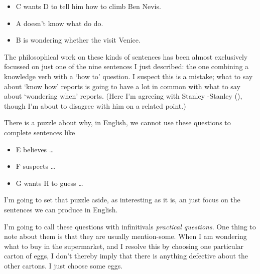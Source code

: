 \documentclass[
  10pt,
  letterpaper,
  twoside]{scrbook}
\providecommand{\tightlist}{%
  \setlength{\itemsep}{0pt}\setlength{\parskip}{0pt}}\usepackage{longtable,booktabs,array}
\begin{document}
\begin{itemize}
\tightlist
\item
  C wants D to tell him how to climb Ben Nevis.
\item
  A doesn't know what do do.
\item
  B is wondering whether the visit Venice.
\end{itemize}

The philosophical work on these kinds of sentences has been almost
exclusively focussed on just one of the nine sentences I just described:
the one combining a knowledge verb with a `how to' question. I suspect
this is a mistake; what to say about `know how' reports is going to have
a lot in common with what to say about `wondering when' reports. (Here
I'm agreeing with Stanley -Stanley (),
though I'm about to disagree with him on a related point.)

There is a puzzle about why, in English, we cannot use these questions
to complete sentences like

\begin{itemize}
\tightlist
\item
  E believes \ldots{}
\item
  F suspects \ldots{}
\item
  G wants H to guess \ldots{}
\end{itemize}

I'm going to set that puzzle aside, as interesting as it is, an just
focus on the sentences we can produce in English.

I'm going to call these questions with infinitivals \emph{practical
questions}. One thing to note about them is that they are usually
mention-some. When I am wondering what to buy in the supermarket, and I
resolve this by choosing one particular carton of eggs, I don't thereby
imply that there is anything defective about the other cartons. I just
choose some eggs.
\end{document}
